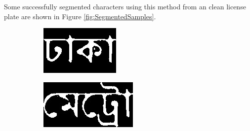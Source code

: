 \documentclass{standalone}
\begin{document}
Some successfully segmented characters using this method from an clean license plate are shown in Figure \ref{fig:SegmentedSamples}.
\begin{figure}
\centering
\begin{subfigure}{0.40\textwidth}
  \centering
  \includegraphics[width=0.8\linewidth]{./img/sample/stage13-1}
\end{subfigure}
\begin{subfigure}{0.40\textwidth}
  \centering
  \includegraphics[width=0.8\linewidth]{./img/sample/stage13-2}
\end{subfigure}
\begin{subfigure}{0.15\textwidth}
  \centering

\end{subfigure}
\end{figure}
\end{document}
